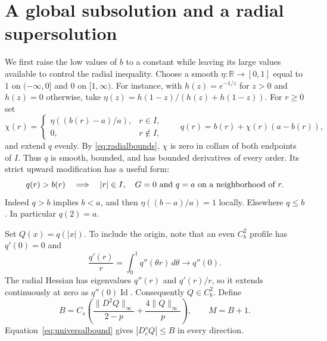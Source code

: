 \documentclass[11pt]{article}
\newcommand{\R}{\mathbb R}
\newcommand{\norm}[1]{\lVert#1\rVert_\infty}
\begin{document}
\section{A global subsolution and a radial supersolution}

We first raise the low values of $b$ to a constant while leaving its large
values available to control the radial inequality. Choose a smooth
$\eta:\R\to[0,1]$ equal to $1$ on $(-\infty,0]$ and $0$ on $[1,\infty)$.
For instance, with $h(z)=e^{-1/z}$ for $z>0$ and $h(z)=0$ otherwise, take
$\eta(z)=h(1-z)/(h(z)+h(1-z))$. For $r\ge0$ set
\begin{equation}\label{eq:cutoff}
 \chi(r)=\begin{cases}\eta((b(r)-a)/a),&r\in I,\\0,&r\notin I,
 \end{cases}
 \qquad q(r)=b(r)+\chi(r)(a-b(r)),
\end{equation}
and extend $q$ evenly. By \eqref{eq:radialbounds}, $\chi$ is zero in collars
of both endpoints of $I$. Thus $q$ is smooth, bounded, and has bounded
derivatives of every order. Its strict upward modification has a useful form:
\begin{equation}\label{eq:flat}
 q(r)>b(r)\quad\Longrightarrow\quad
 |r|\in I,\quad G=0\ \hbox{and}\ q=a
 \ \hbox{on a neighborhood of }r.
\end{equation}
Indeed $q>b$ implies $b<a$, and then $\eta((b-a)/a)=1$ locally. Elsewhere
$q\le b$. In particular $q(2)=a$.

Set $Q(x)=q(|x|)$. To include the origin, note that an even $C_b^2$ profile
has $q'(0)=0$ and
\[
 \frac{q'(r)}r=\int_0^1q''(\theta r)\,d\theta\longrightarrow q''(0).
\]
The radial Hessian has eigenvalues $q''(r)$ and $q'(r)/r$, so it extends
continuously at zero as $q''(0)\operatorname{Id}$. Consequently $Q\in C_b^2$.
Define
\begin{equation}\label{eq:BM}
 B=C_s\left(\frac{\norm{D^2Q}}{2-p}+\frac{4\norm Q}{p}\right),
 \qquad M=B+1.
\end{equation}
Equation~\eqref{eq:universalbound} gives $|D_e^sQ|\le B$ in every direction.
\end{document}

